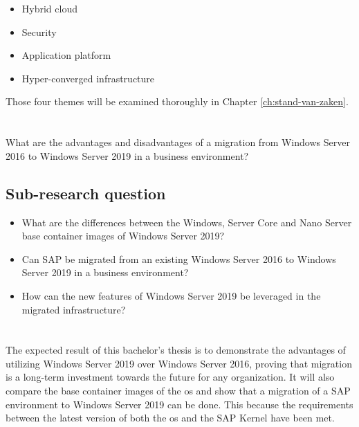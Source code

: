 \begin{itemize}
	\item Hybrid cloud
	\item Security
	\item Application platform
	\item Hyper-converged infrastructure
\end{itemize}

Those four themes will be examined thoroughly in Chapter \ref{ch:stand-van-zaken}.

\section{}
\label{sec:onderzoeksvraag}
What are the advantages and disadvantages of a migration from Windows Server 2016 to Windows Server 2019 in a business environment?

\subsection{Sub-research question}

\begin{itemize}
	\item What are the differences between the Windows, Server Core and Nano Server base container images of Windows Server 2019?
	\item Can SAP be migrated from an existing Windows Server 2016 to Windows Server 2019 in a business environment?
	\item How can the new features of Windows Server 2019 be leveraged in the migrated infrastructure? 
\end{itemize}

\section{}
\label{sec:onderzoeksdoelstelling}

The expected result of this bachelor's thesis is to demonstrate the advantages of utilizing Windows Server 2019 over Windows Server 2016, proving that migration is a long-term investment towards the future for any organization. 
It will also compare the base container images of the \acrshort{os} and show that a migration of a SAP environment to Windows Server 2019 can be done. 
This because the  requirements between the latest version of both the \acrshort{os} and the SAP Kernel have been met. 

